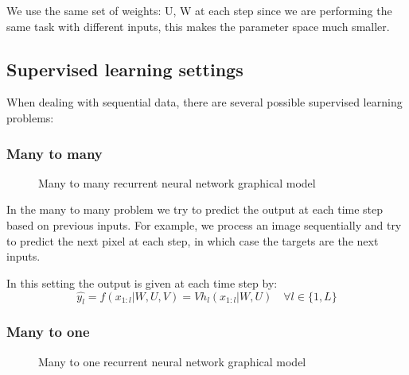 \documentclass[11pt,oneside,openright]{report}
\begin{document}
We use the same set of weights: U, W at each step since we are performing the same task with different inputs, this makes the parameter space much smaller.

\subsection{Supervised learning settings}
When dealing with sequential data, there are several possible supervised learning problems:
\subsubsection{Many to many}
\begin{figure}[H]
\centering
{}
\caption{Many to many recurrent neural network graphical model}
\end{figure}
In the many to many problem we try to predict the output at each time step based on previous inputs. For example, we process an image sequentially and try to predict the next pixel at each step, in which case the targets are the next inputs.

In this setting the output is given at each time step by:
$$ \hat{y_l} = f(x_{1:l}|W, U, V) = V h_l(x_{1:l}|W,U)\quad \forall l \in \{1, L\}$$

\subsubsection{Many to one}
\begin{figure}[H]
\centering
{}
\caption{Many to one recurrent neural network graphical model }
\end{figure}
\end{document}
